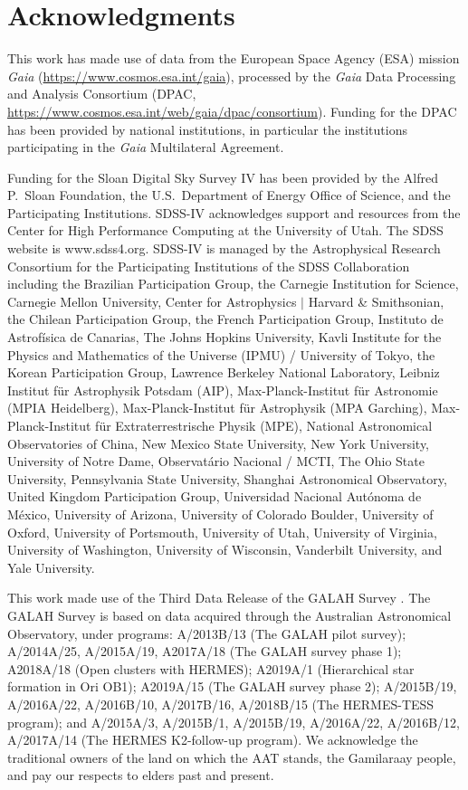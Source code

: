 \documentclass{aa}  %
\begin{document}
\section*{Acknowledgments}
This work has made use of data from the European Space Agency (ESA)
mission {\it Gaia} (\url{https://www.cosmos.esa.int/gaia}), processed by
the {\it Gaia} Data Processing and Analysis Consortium (DPAC,
\url{https://www.cosmos.esa.int/web/gaia/dpac/consortium}).  Funding for
the DPAC has been provided by national institutions, in particular the
institutions participating in the {\it Gaia} Multilateral Agreement.

Funding for the Sloan Digital Sky Survey IV has been provided by the
Alfred P.\ Sloan Foundation, the U.S.\ Department of Energy Office of
Science, and the Participating Institutions.  SDSS-IV acknowledges
support and resources from the Center for High Performance Computing at
the University of Utah.  The SDSS website is www.sdss4.org.  SDSS-IV is
managed by the Astrophysical Research Consortium for the Participating
Institutions of the SDSS Collaboration including the Brazilian
Participation Group, the Carnegie Institution for Science, Carnegie
Mellon University, Center for Astrophysics $|$ Harvard \& Smithsonian,
the Chilean Participation Group, the French Participation Group,
Instituto de Astrof\'isica de Canarias, The Johns Hopkins University,
Kavli Institute for the Physics and Mathematics of the Universe (IPMU)
/ University of Tokyo, the Korean Participation Group, Lawrence
Berkeley National Laboratory, Leibniz Institut f\"ur Astrophysik
Potsdam (AIP), Max-Planck-Institut f\"ur Astronomie (MPIA Heidelberg),
Max-Planck-Institut f\"ur Astrophysik (MPA Garching),
Max-Planck-Institut f\"ur Extraterrestrische Physik (MPE), National
Astronomical Observatories of China, New Mexico State University, New
York University, University of Notre Dame, Observat\'ario Nacional /
MCTI, The Ohio State University, Pennsylvania State University,
Shanghai Astronomical Observatory, United Kingdom Participation Group,
Universidad Nacional Aut\'onoma de M\'exico, University of Arizona,
University of Colorado Boulder, University of Oxford, University of
Portsmouth, University of Utah, University of Virginia, University of
Washington, University of Wisconsin, Vanderbilt University, and Yale
University.

This work made use of the Third Data Release of the GALAH Survey
\citep{Buder2021}.  The GALAH Survey is based on data acquired through
the Australian Astronomical Observatory, under programs: A/2013B/13
(The GALAH pilot survey); A/2014A/25, A/2015A/19, A2017A/18 (The GALAH
survey phase 1); A2018A/18 (Open clusters with HERMES); A2019A/1
(Hierarchical star formation in Ori OB1); A2019A/15 (The GALAH survey
phase 2); A/2015B/19, A/2016A/22, A/2016B/10, A/2017B/16, A/2018B/15
(The HERMES-TESS program); and A/2015A/3, A/2015B/1, A/2015B/19,
A/2016A/22, A/2016B/12, A/2017A/14 (The HERMES K2-follow-up program).
We acknowledge the traditional owners of the land on which the AAT
stands, the Gamilaraay people, and pay our respects to elders past and
present.
\end{document}
